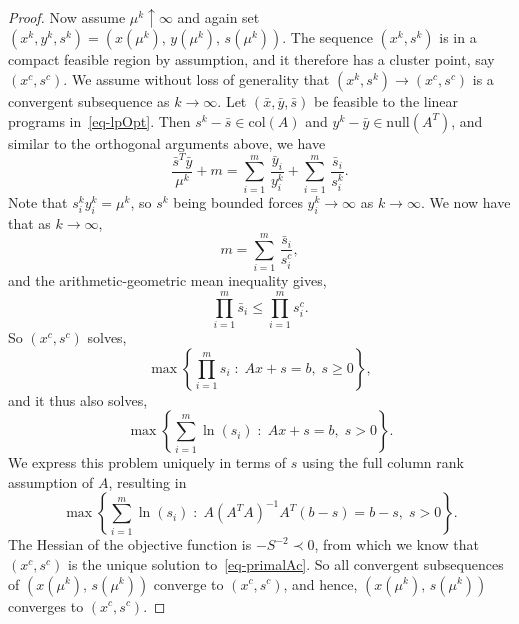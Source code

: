 \documentclass[10pt,a4paper]{amsart}
\def\nd{\prec}
\def\sb{\bar{s}}
\def\xb{\bar{x}}
\def\yb{\bar{y}}
\begin{document}
\begin{proof}
Now assume $\mu^k \uparrow \infty$ and again set 
$(x^k, y^k, s^k) = (x(\mu^k), \, y(\mu^k), \, s(\mu^k) )$.
The sequence $(x^k, s^k)$ is in a compact feasible region by assumption,
and it therefore has a cluster point, say $(x^c, s^c)$. We assume without
loss of generality that $(x^k, s^k) \rightarrow (x^c, s^c)$ is a convergent
subsequence as $k \rightarrow \infty$. Let $(\xb, \yb, \sb)$ be feasible 
to the linear programs in~\eqref{eq-lpOpt}. Then $s^k - \sb \in \mbox{col}(A)$ 
and $y^k - \yb \in \mbox{null}(A^T)$, and similar to the orthogonal 
arguments above, we have
\[
\frac{\sb^T \yb}{\mu^k} + m = 
    \sum_{i=1}^m \, \frac{\yb_i}{y^k_i} + 
    \sum_{i=1}^m \, \frac{\sb_i}{s^k_i}.
\]
Note that $s^k_i y^k_i = \mu^k$, so $s^k$ being bounded forces
$y^k_i \rightarrow \infty$ as $k \rightarrow \infty$. We now have that as
$k \rightarrow \infty$,
\[
m = \sum_{i=1}^m \, \frac{\sb_i}{s^c_i},
\]
and the arithmetic-geometric mean inequality gives,
\[
\prod_{i=1}^m \sb_i \le \prod_{i=1}^m s^c_i.
\]
So $(x^c, s^c)$ solves,
\[
\max \left\{ \prod_{i=1}^m s_i \; : \; Ax + s = b, \; s \ge 0 \right\},
\]
and it thus also solves,
\[
\max \left\{ \sum_{i=1}^m \ln(s_i) \; : \; Ax + s = b, \; s > 0 \right\}.
\]
We express this problem uniquely in terms of $s$ using the full column rank 
assumption of $A$, resulting in
\[
\max \left\{ \sum_{i=1}^m \ln(s_i) \; : \; A(A^TA)^{-1}A^T(b-s) = b-s, \; s > 0 \right\}.
\]
The Hessian of the objective function is $-S^{-2} \nd 0$, from 
which we know that $(x^c, s^c)$ is the unique solution 
to~\eqref{eq-primalAc}. So all convergent subsequences of
$(x(\mu^k), \, s(\mu^k) )$ converge to $(x^c, s^c)$, and hence,
$(x(\mu^k), \, s(\mu^k) )$ converges to $(x^c, s^c)$. 
\end{proof}
\end{document}
